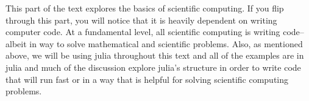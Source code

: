 
This part of the text explores the basics of scientific computing.  If you flip through this part, you will notice that it is heavily dependent on writing computer code.  At a fundamental level, all scientific computing is writing code--albeit in way to solve mathematical and scientific problems.  Also, as mentioned above, we will be using julia throughout this text and all of the examples are in julia and much of the discussion explore julia's structure in order to write code that will run fast or in a way that is helpful for solving scientific computing problems.  